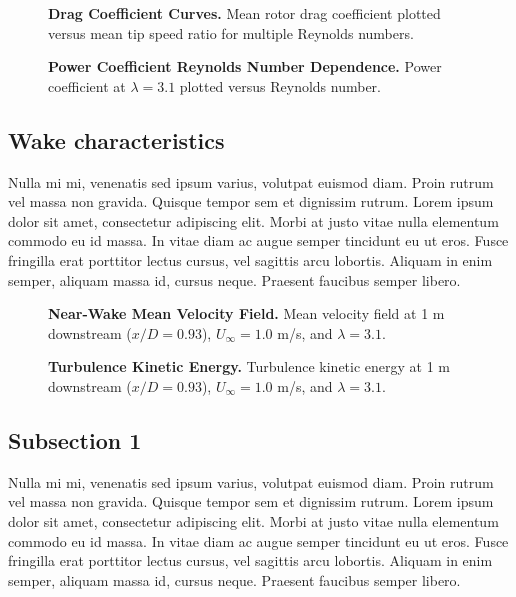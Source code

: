 \documentclass[10pt,letterpaper]{article}
\begin{document}
\begin{figure}[h]
\caption{{\bf Drag Coefficient Curves.}
Mean rotor drag coefficient plotted versus mean tip speed ratio for multiple
Reynolds numbers.}
\label{cd-curves}
\end{figure}


\begin{figure}[h]
\caption{{\bf Power Coefficient Reynolds Number Dependence.}
Power coefficient at $\lambda=3.1$ plotted versus Reynolds number.}
\label{cp-re-dep}
\end{figure}


\subsection*{Wake characteristics}

Nulla mi mi, venenatis sed ipsum varius, volutpat euismod diam. Proin rutrum vel
massa non gravida. Quisque tempor sem et dignissim rutrum. Lorem ipsum dolor sit
amet, consectetur adipiscing elit. Morbi at justo vitae nulla elementum commodo
eu id massa. In vitae diam ac augue semper tincidunt eu ut eros. Fusce fringilla
erat porttitor lectus cursus, vel sagittis arcu lobortis. Aliquam in enim
semper, aliquam massa id, cursus neque. Praesent faucibus semper libero.


\begin{figure}[h]
\caption{{\bf Near-Wake Mean Velocity Field.}
Mean velocity field at 1 m downstream ($x/D=0.93$), $U_\infty=1.0$ m/s, and
$\lambda=3.1$.}
\label{meancontquiv}
\end{figure}


\begin{figure}[h]
\caption{{\bf Turbulence Kinetic Energy.}
Turbulence kinetic energy at 1 m downstream ($x/D=0.93$), $U_\infty=1.0$ m/s, and
$\lambda=3.1$.}
\label{kcont}
\end{figure}


\subsection*{Subsection 1}
Nulla mi mi, venenatis sed ipsum varius, volutpat euismod diam. Proin rutrum vel
massa non gravida. Quisque tempor sem et dignissim rutrum. Lorem ipsum dolor sit
amet, consectetur adipiscing elit. Morbi at justo vitae nulla elementum commodo
eu id massa. In vitae diam ac augue semper tincidunt eu ut eros. Fusce fringilla
erat porttitor lectus cursus, vel sagittis arcu lobortis. Aliquam in enim
semper, aliquam massa id, cursus neque. Praesent faucibus semper libero.
\end{document}
